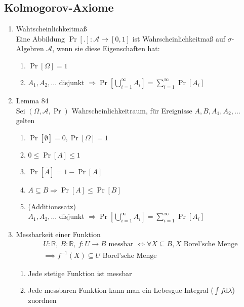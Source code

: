 \documentclass[landscape, 8pt]{extarticle}
\newcommand{\Rarr}{\Rightarrow}
\newcommand{\Lrarr}{\Leftrightarrow}
\newcommand{\rarr}{\rightarrow}
\newcommand{\R}{\mathbb{R}}
\newcommand{\A}{\mathcal{A}}
\newcommand{\intd}{\text{d}}
\begin{document}
\begin{multicols*}{3}
\subsection{Kolmogorov-Axiome}
\begin{enumerate}
\item{Wahtscheinlichkeitmaß\\
Eine Abbildung $\Pr[.] : \A \rarr [0,1]$ ist Wahrscheinlichkeitmaß auf $\sigma$-Algebren $\A$, wenn sie diese Eigenschaften hat:
\begin{enumerate}[label= W\arabic*)]
\item{
$\Pr[\Omega] = 1$
}
\item {
$A_1,A_2,\dots$ disjunkt $\Rarr \Pr\left[\bigcup_{i=1}^\infty A_i\right] = \sum_{i = 1}^\infty \Pr[A_i]$
}
\end{enumerate}
}
\item {Lemma 84\\
Sei $(\Omega, \A, \Pr)$ Wahrscheinlichkeitraum, für Ereignisse $A, B, A_1, A_2, \dots$ gelten
\begin{enumerate}[label = \alph*)]
\item {
$\Pr[\emptyset] = 0, \Pr[\Omega] = 1$
}
\item{
$0 \leq \Pr[A] \leq 1$
}
\item{
$\Pr[\overline{A}] = 1 - \Pr[A]$
}
\item{
$A \subseteq B \Rarr \Pr[A] \leq \Pr[B]$
}
\item{(Additionssatz) \\
$A_1,A_2,\dots$ disjunkt $\Rarr \Pr\left[\bigcup_{i=1}^\infty A_i\right] = \sum_{i = 1}^\infty \Pr[A_i]$
}
\end{enumerate}
}
\item {Messbarkeit einer Funktion
\begin{align*}
&U : \R, ~B : \R, ~f: U \rarr B \text{ messbar } \Lrarr \forall X\subseteq B, X \text{ Borel'sche Menge} \\ &\implies f^{-1}(X) \subseteq U \text{ Borel'sche Menge}
\end{align*}
\begin{enumerate}[label = \alph*)]
\item {Jede stetige Funktion ist messbar}
\item {Jede messbaren Funktion kann man ein Lebesgue Integral ($\int f \intd \lambda$) zuordnen}
\end{enumerate}
}
\end{enumerate}


\end{multicols*}
\end{document}
